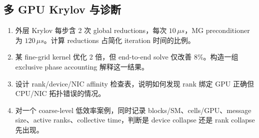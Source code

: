 \subsection*{多 GPU Krylov 与诊断}
\begin{enumerate}[label=\arabic*.]
\item 外层 Krylov 每步含 2 次 global reductions，每次 $10\,\mu s$，MG preconditioner 为 $120\,\mu s$。计算 reductions 占简化 iteration 时间的比例。
\item 某 fine-grid kernel 优化 2 倍，但 end-to-end solve 仅改善 8\%。构造一组 exclusive phase accounting 解释这一结果。
\item 设计 rank/device/NIC affinity 检查表，说明如何发现 rank 绑定 GPU 正确但 CPU/NIC 拓扑错误的情况。
\item 对一个 coarse-level 低效率案例，同时记录 blocks/SM、cells/GPU、message size、active ranks、collective time，判断是 device collapse 还是 rank collapse 先出现。
\end{enumerate}
